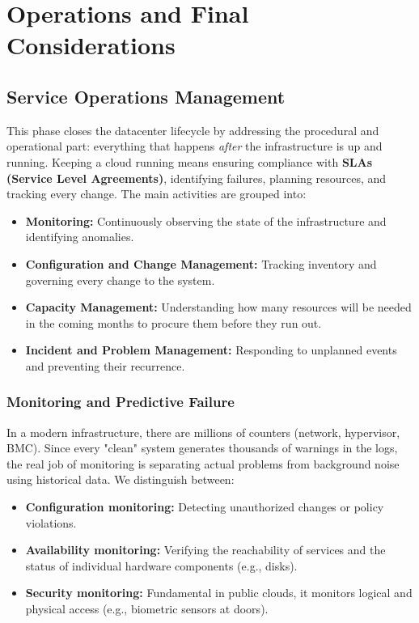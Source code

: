 \chapter{Operations and Final Considerations}

\section{Service Operations Management}
This phase closes the datacenter lifecycle by addressing the procedural and operational part: everything that happens \textit{after} the infrastructure is up and running. Keeping a cloud running means ensuring compliance with \textbf{SLAs (Service Level Agreements)}, identifying failures, planning resources, and tracking every change.
The main activities are grouped into:
\begin{itemize}
    \item \textbf{Monitoring:} Continuously observing the state of the infrastructure and identifying anomalies.
    \item \textbf{Configuration and Change Management:} Tracking inventory and governing every change to the system.
    \item \textbf{Capacity Management:} Understanding how many resources will be needed in the coming months to procure them before they run out.
    \item \textbf{Incident and Problem Management:} Responding to unplanned events and preventing their recurrence.
\end{itemize}

\subsection{Monitoring and Predictive Failure}
In a modern infrastructure, there are millions of counters (network, hypervisor, BMC). Since every "clean" system generates thousands of warnings in the logs, the real job of monitoring is separating actual problems from background noise using historical data.
We distinguish between:
\begin{itemize}
    \item \textbf{Configuration monitoring:} Detecting unauthorized changes or policy violations.
    \item \textbf{Availability monitoring:} Verifying the reachability of services and the status of individual hardware components (e.g., disks).
    \item \textbf{Security monitoring:} Fundamental in public clouds, it monitors logical and physical access (e.g., biometric sensors at doors).
\end{itemize}

